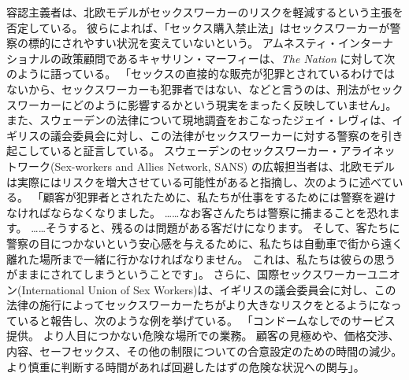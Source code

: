 \documentclass[paper=a4,book,openany]{jlreq}
\begin{document}
容認主義者は、北欧モデルがセックスワーカーのリスクを軽減するという主張を否定している。
彼らによれば、「セックス購入禁止法」はセックスワーカーが警察の標的にされやすい状況を変えていないという。
アムネスティ・インターナショナルの政策顧問であるキャサリン・マーフィーは、\emph{The Nation} に対して次のように語っている。
「セックスの直接的な販売が犯罪とされているわけではないから、セックスワーカーも犯罪者ではない、などと言うのは、刑法がセックスワーカーにどのように影響するかという現実をまったく反映していません」\citep{grant16:_amnes_inter_calls_end_nordic}。
また、スウェーデンの法律について現地調査をおこなったジェイ・レヴィは、イギリスの議会委員会に対し、この法律がセックスワーカーに対する警察のを引き起こしていると証言している。
スウェーデンのセックスワーカー・アライネットワーク(Sex-workers and Allies Network, SANS) の広報担当者は、北欧モデルは実際にはリスクを増大させている可能性があると指摘し、次のように述べている。
「顧客が犯罪者とされたために、私たちが仕事をするためには警察を避けなければならなくなりました。
……なお客さんたちは警察に捕まることを恐れます。
……そうすると、残るのは問題がある客だけになります。
そして、客たちに警察の目につかないという安心感を与えるために、私たちは自動車で街から遠く離れた場所まで一緒に行かなければなりません。
これは、私たちは彼らの思うがままにされてしまうということです」\citep{savage08:_swedis_prost}。
さらに、国際セックスワーカーユニオン(International Union of Sex Workers)は、イギリスの議会委員会に対し、この法律の施行によってセックスワーカーたちがより大きなリスクをとるようになっていると報告し、次のような例を挙げている。
「コンドームなしでのサービス提供。
より人目につかない危険な場所での業務。
顧客の見極めや、価格交渉、内容、セーフセックス、その他の制限についての合意設定のための時間の減少。
より慎重に判断する時間があれば回避したはずの危険な状況への関与」\citep[p.26]{commons16:_prost}。
\end{document}

